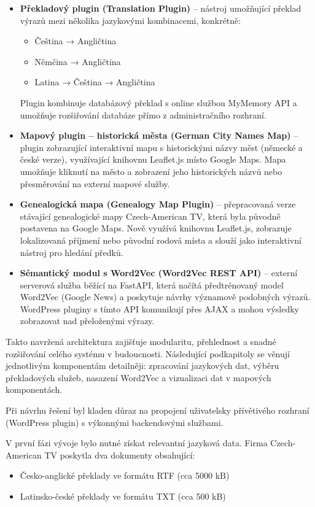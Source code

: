 \documentclass[czech, ba, kiv, he]{fasthesis}
\begin{document}
\begin{itemize} 
\item \textbf{Překladový plugin (Translation Plugin)} – nástroj umožňující překlad výrazů mezi několika jazykovými kombinacemi, konkrétně: \begin{itemize} 
\item Čeština → Angličtina 
\item Němčina → Angličtina
 \item Latina → Čeština → Angličtina
 \end{itemize} 
 Plugin kombinuje databázový překlad s online službou MyMemory API a umožňuje rozšiřování databáze přímo z administračního rozhraní.


\item \textbf{Mapový plugin – historická města (German City Names Map)} – plugin zobrazující interaktivní mapu s historickými názvy měst (německé a české verze), využívající knihovnu Leaflet.js místo Google Maps. Mapa umožňuje kliknutí na město a zobrazení jeho historických názvů nebo přesměrování na externí mapové služby.

\item \textbf{Genealogická mapa (Genealogy Map Plugin)} – přepracovaná verze stávající genealogické mapy Czech-American TV, která byla původně postavena na Google Maps. Nově využívá knihovnu Leaflet.js, zobrazuje lokalizovaná příjmení nebo původní rodová místa a slouží jako interaktivní nástroj pro hledání předků.

\item \textbf{Sémantický modul s Word2Vec (Word2Vec REST API)} – externí serverová služba běžící na FastAPI, která načítá předtrénovaný model Word2Vec (Google News) a poskytuje návrhy významově podobných výrazů. WordPress pluginy s tímto API komunikují přes AJAX a mohou výsledky zobrazovat nad přeloženými výrazy. \end{itemize}

Takto navržená architektura zajišťuje modularitu, přehlednost a snadné rozšiřování celého systému v budoucnosti. Následující podkapitoly se věnují jednotlivým komponentám detailněji: zpracování jazykových dat, výběru překladových služeb, nasazení Word2Vec a vizualizaci dat v mapových komponentách.

Při návrhu řešení byl kladen důraz na propojení uživatelsky přívětivého rozhraní (WordPress plugin) s výkonnými backendovými službami. 

V první fázi vývoje bylo nutné získat relevantní jazyková data. Firma Czech-American TV poskytla dva dokumenty obsahující:
\begin{itemize}
    \item Česko-anglické překlady ve formátu RTF (cca 5000 kB)
    \item Latinsko-české překlady ve formátu TXT (cca 500 kB)
\end{itemize}
\end{document}
